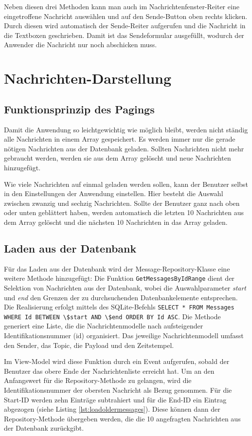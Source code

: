Neben diesen drei Methoden kann man auch im Nachrichtenfenster-Reiter eine eingetroffene Nachricht auswählen und auf den Sende-Button oben rechts klicken. Durch diesen wird automatisch der Sende-Reiter aufgerufen und die Nachricht in die Textboxen geschrieben. Damit ist das Sendeformular ausgefüllt, wodurch der Anwender die Nachricht nur noch abschicken muss.

\section{Nachrichten-Darstellung}
\subsection{Funktionsprinzip des Pagings}
Damit die Anwendung so leichtgewichtig wie möglich bleibt, werden nicht ständig alle Nachrichten in einem Array gespeichert. Es werden immer nur die gerade nötigen Nachrichten aus der Datenbank geladen. Sollten Nachrichten nicht mehr gebraucht werden, werden sie aus dem Array gelöscht und neue Nachrichten hinzugefügt.

Wie viele Nachrichten auf einmal geladen werden sollen, kann der Benutzer selbst in den Einstellungen der Anwendung einstellen. Hier besteht die Auswahl zwischen zwanzig und sechzig Nachrichten. Sollte der Benutzer ganz nach oben oder unten geblättert haben, werden automatisch die letzten 10 Nachrichten aus dem Array gelöscht und die nächsten 10 Nachrichten in das Array geladen.
\subsection{Laden aus der Datenbank}
Für das Laden aus der Datenbank wird der Message-Repository-Klasse eine weitere Methode hinzugefügt: Die Funktion \lstinline|GetMessagesByIdRange| dient der Selektion von Nachrichten aus der Datenbank, wobei die Auswahlparameter \textit{start} und \textit{end} den Grenzen der zu durchsuchenden Datenbankelemente entsprechen. Die Realisierung erfolgt mittels des SQLite-Befehls \lstinline|SELECT * FROM Messages WHERE Id BETWEEN \$start AND \$end ORDER BY Id ASC|.
Die Methode generiert eine Liste, die die Nachrichtenmodelle nach aufsteigender Identifikationsnummer (id) organisiert. Das jeweilige Nachrichtenmodell umfasst den Sender, das Topic, die Payload und den Zeitstempel.

Im View-Model wird diese Funktion durch ein Event aufgerufen, sobald der Benutzer das obere Ende der Nachrichtenliste erreicht hat. Um an den Anfangswert für die Repository-Methode zu gelangen, wird die Identifikationsnummer der obersten Nachricht als Bezug genommen. Für die Start-ID werden zehn Einträge subtrahiert und für die End-ID ein Eintrag abgezogen (siehe Listing \ref{lst:loadoldermessages}).
Diese können dann der Repository-Methode übergeben werden, die die 10 angefragten Nachrichten aus der Datenbank zurückgibt. 

